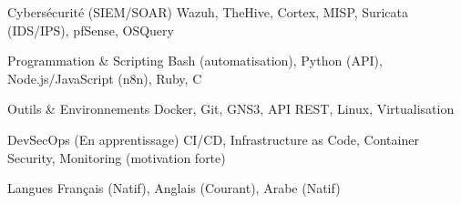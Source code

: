 
\begin{cvskills}

    \cvskill
    {Cybersécurité (SIEM/SOAR)} %
    {Wazuh, TheHive, Cortex, MISP, Suricata (IDS/IPS), pfSense, OSQuery} %

    \cvskill
    {Programmation \& Scripting} %
    {Bash (automatisation), Python (API), Node.js/JavaScript (n8n), Ruby, C} %

    \cvskill
    {Outils \& Environnements} %
    {Docker, Git, GNS3, API REST, Linux, Virtualisation} %

    \cvskill
    {DevSecOps (En apprentissage)} %
    {CI/CD, Infrastructure as Code, Container Security, Monitoring (motivation forte)} %

    \cvskill
    {Langues} %
    {Français (Natif), Anglais (Courant), Arabe (Natif)} %

\end{cvskills}